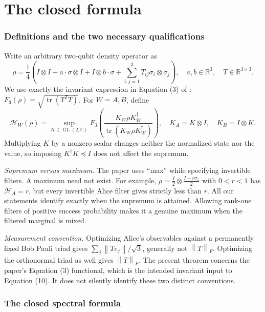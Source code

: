 \documentclass[11pt]{article}
\theoremstyle{remark}\newtheorem{remark}[theorem]{Remark}
\newcommand{\R}{\mathbb R}
\newcommand{\C}{\mathbb C}
\newcommand{\tr}{\operatorname{tr}}
\newcommand{\HF}{\mathcal H}
\newcommand{\norm}[1]{\left\lVert#1\right\rVert}
\begin{document}
\part*{The closed formula}

\section{Definitions and the two necessary qualifications}\label{sec:defs}

Write an arbitrary two-qubit density operator as
\begin{equation}\label{eq:bloch}
\rho=\frac14\left(I\otimes I+a\cdot\sigma\otimes I+
 I\otimes b\cdot\sigma+\sum_{i,j=1}^3T_{ij}\sigma_i\otimes\sigma_j\right),
\quad a,b\in\R^3,\quad T\in\R^{3\times3}.
\end{equation}
We use exactly the invariant expression in Equation (3) of \cite{ducuara}:
$F_3(\rho)=\sqrt{\tr(T^TT)}$. For $W=A,B$, define
\begin{equation}\label{eq:def}
\HF_W(\rho)=\sup_{K\in\operatorname{GL}(2,\C)}
 F_3\left(\frac{K_W\rho K_W^\dagger}{\tr(K_W\rho K_W^\dagger)}\right),
\quad K_A=K\otimes I,\quad K_B=I\otimes K.
\end{equation}
Multiplying $K$ by a nonzero scalar changes neither the normalized state nor
the value, so imposing $K^\dagger K\preceq I$ does not affect the supremum.

\emph{Supremum versus maximum.} The paper uses ``max'' while specifying
invertible filters. A maximum need not exist. For example,
$\rho=\frac I2\otimes\frac{I+r\sigma_z}{2}$ with $0<r<1$ has
$\HF_A=r$, but every invertible Alice filter gives strictly less than $r$.
All our statements identify exactly when the supremum is attained. Allowing
rank-one filters of positive success probability makes it a genuine maximum
when the filtered marginal is mixed.

\emph{Measurement convention.} Optimizing Alice's observables against a
permanently fixed Bob Pauli triad gives
$\sum_j\norm{Te_j}/\sqrt3$, generally not $\norm{T}_F$. Optimizing the
orthonormal triad as well gives $\norm{T}_F$. The present theorem concerns
the paper's Equation (3) functional, which is the intended invariant input to
Equation (10). It does not silently identify these two distinct conventions.

\section{The closed spectral formula}\label{sec:formula}
\end{document}
